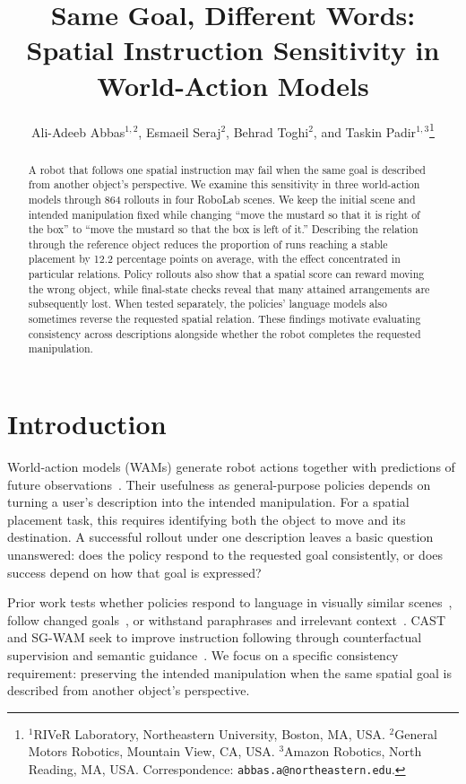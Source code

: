 \documentclass{article}
\title{Same Goal, Different Words:\\Spatial Instruction Sensitivity in World-Action Models}
\author{Ali-Adeeb Abbas$^{1,2}$, Esmaeil Seraj$^2$, Behrad Toghi$^2$, and Taskin Padir$^{1,3}$\thanks{$^1$RIVeR Laboratory, Northeastern University, Boston, MA, USA. $^2$General Motors Robotics, Mountain View, CA, USA. $^3$Amazon Robotics, North Reading, MA, USA. Correspondence: \texttt{abbas.a@northeastern.edu}.}}
\begin{document}
\maketitle
\begin{abstract}
A robot that follows one spatial instruction may fail when the same goal is described from another object's perspective. We examine this sensitivity in three world-action models through 864 rollouts in four RoboLab scenes. We keep the initial scene and intended manipulation fixed while changing ``move the mustard so that it is right of the box'' to ``move the mustard so that the box is left of it.'' Describing the relation through the reference object reduces the proportion of runs reaching a stable placement by 12.2 percentage points on average, with the effect concentrated in particular relations. Policy rollouts also show that a spatial score can reward moving the wrong object, while final-state checks reveal that many attained arrangements are subsequently lost. When tested separately, the policies' language models also sometimes reverse the requested spatial relation. These findings motivate evaluating consistency across descriptions alongside whether the robot completes the requested manipulation.

\end{abstract}

\setlength{\parskip}{2.5pt}
\setlength{\intextsep}{8pt plus 2pt minus 2pt}
\setlength{\textfloatsep}{12pt plus 2pt minus 2pt}
\section{Introduction}
World-action models (WAMs) generate robot actions together with predictions of future observations~\citep{kim2026cosmospolicy}. Their usefulness as general-purpose policies depends on turning a user's description into the intended manipulation. For a spatial placement task, this requires identifying both the object to move and its destination. A successful rollout under one description leaves a basic question unanswered: does the policy respond to the requested goal consistently, or does success depend on how that goal is expressed?

Prior work tests whether policies respond to language in visually similar scenes~\citep{tri2025lbm}, follow changed goals~\citep{fang2026counterfactual}, or withstand paraphrases and irrelevant context~\citep{fei2026liberoplus,kim2026liberopara,moskalenko2026bring}. CAST and SG-WAM seek to improve instruction following through counterfactual supervision and semantic guidance~\citep{glossop2025cast,he2026sgwam}. We focus on a specific consistency requirement: preserving the intended manipulation when the same spatial goal is described from another object's perspective.
\end{document}
